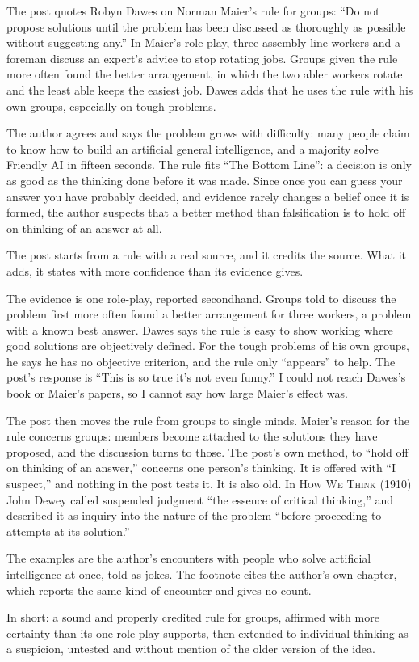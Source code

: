 \begin{afterword}
\summaryhead

The post quotes Robyn Dawes on Norman Maier's rule for groups: ``Do not propose solutions until the problem has been discussed as thoroughly as possible without suggesting any.'' In Maier's role-play, three assembly-line workers and a foreman discuss an expert's advice to stop rotating jobs. Groups given the rule more often found the better arrangement, in which the two abler workers rotate and the least able keeps the easiest job. Dawes adds that he uses the rule with his own groups, especially on tough problems.

The author agrees and says the problem grows with difficulty: many people claim to know how to build an artificial general intelligence, and a majority solve Friendly AI in fifteen seconds. The rule fits ``The Bottom Line'': a decision is only as good as the thinking done before it was made. Since once you can guess your answer you have probably decided, and evidence rarely changes a belief once it is formed, the author suspects that a better method than falsification is to hold off on thinking of an answer at all.

\responsehead

The post starts from a rule with a real source, and it credits the source. What it adds, it states with more confidence than its evidence gives.

The evidence is one role-play, reported secondhand. Groups told to discuss the problem first more often found a better arrangement for three workers, a problem with a known best answer. Dawes says the rule is easy to show working where good solutions are objectively defined. For the tough problems of his own groups, he says he has no objective criterion, and the rule only ``appears'' to help. The post's response is ``This is so true it's not even funny.'' I could not reach Dawes's book or Maier's papers, so I cannot say how large Maier's effect was.

The post then moves the rule from groups to single minds. Maier's reason for the rule concerns groups: members become attached to the solutions they have proposed, and the discussion turns to those. The post's own method, to ``hold off on thinking of an answer,'' concerns one person's thinking. It is offered with ``I suspect,'' and nothing in the post tests it. It is also old. In \textsc{How We Think} (1910) John Dewey called suspended judgment ``the essence of critical thinking,'' and described it as inquiry into the nature of the problem ``before proceeding to attempts at its solution.''

The examples are the author's encounters with people who solve artificial intelligence at once, told as jokes. The footnote cites the author's own chapter, which reports the same kind of encounter and gives no count.

In short: a sound and properly credited rule for groups, affirmed with more certainty than its one role-play supports, then extended to individual thinking as a suspicion, untested and without mention of the older version of the idea.
\end{afterword}
